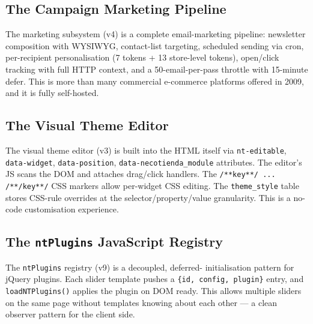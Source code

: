 \documentclass[11pt,a4paper]{article}
\begin{document}
\subsection{The Campaign Marketing Pipeline}

\begin{goodbox}
The marketing subsystem (v4) is a complete email-marketing pipeline:
newsletter composition with WYSIWYG, contact-list targeting,
scheduled sending via cron, per-recipient personalisation (7 tokens +
13 store-level tokens), open/click tracking with full HTTP context,
and a 50-email-per-pass throttle with 15-minute defer. This is more
than many commercial e-commerce platforms offered in 2009, and it is
fully self-hosted.
\end{goodbox}

\subsection{The Visual Theme Editor}

\begin{goodbox}
The visual theme editor (v3) is built into the HTML itself via
\texttt{nt-editable}, \texttt{data-widget}, \texttt{data-position},
\texttt{data-necotienda\_module} attributes. The editor's JS scans
the DOM and attaches drag/click handlers. The
\texttt{/**key**/ ... /**/key**/} CSS markers allow per-widget CSS
editing. The \texttt{theme\_style} table stores CSS-rule overrides
at the selector/property/value granularity. This is a
no-code customisation experience.
\end{goodbox}

\subsection{The \texttt{ntPlugins} JavaScript Registry}

\begin{goodbox}
The \texttt{ntPlugins} registry (v9) is a decoupled, deferred-
initialisation pattern for jQuery plugins. Each slider template
pushes a \texttt{\{id, config, plugin\}} entry, and
\texttt{loadNTPlugins()} applies the plugin on DOM ready. This allows
multiple sliders on the same page without templates knowing about
each other --- a clean observer pattern for the client side.
\end{goodbox}

\end{document}
